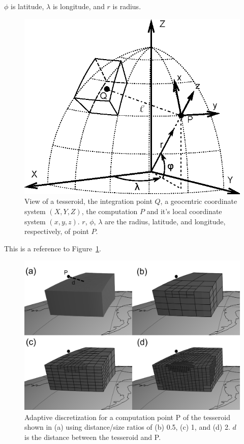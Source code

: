 \documentclass[paper,twocolumn,twoside]{geophysics}
\begin{document}
$\phi$ is latitude,
$\lambda$ is longitude, and
$r$ is radius.

\begin{figure}
    \centering
    \includegraphics[width=\columnwidth]{figs/tesseroid}
    \caption{
        View of a tesseroid,
        the integration point $Q$,
        a geocentric coordinate system $(X, Y, Z)$,
        the computation $P$ and it's local coordinate system $(x, y, z)$.
        $r$, $\phi$, $\lambda$ are
        the radius, latitude, and longitude, respectively, of point $P$.
    }
    \label{fig:tesseroid}
\end{figure}

This is a reference to Figure~\ref{fig:tesseroid}.

\begin{figure}
    \centering
    \includegraphics[width=\columnwidth]{figs/tesseroid-split.png}
    \caption{
        Adaptive discretization for a computation point P
        of the tesseroid shown in (a) using distance/size ratios of
        (b) 0.5, (c) 1, and (d) 2.
        $d$ is the distance between the tesseroid and P.
    }
    \label{fig:split}
\end{figure}
\end{document}
